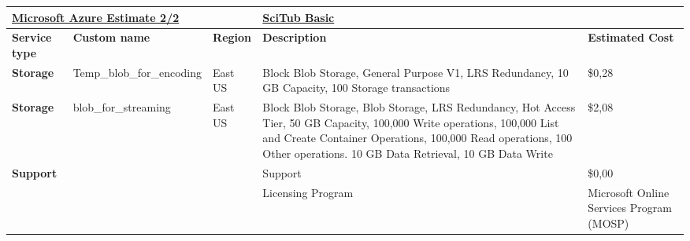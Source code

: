 \begin{landscape}
\begin{table}[]
    \begin{tabularx}{\linewidth}{|l|X|X|X|X|}        %
    \hline
    \multicolumn{3}{|l|}{{\ul \textbf{Microsoft Azure Estimate 2/2}}}                     & {\ul \textbf{SciTub Basic}}                                                                                                                                                                                                                      & {\ul \textbf{}}                          \\ \hline
    \textbf{Service type}             & \textbf{Custom name}      & \textbf{Region} & \textbf{Description}                                                                                                                                                                                                                             & \textbf{Estimated Cost}                  \\ \hline\hline
    \textbf{Storage}                  & Temp\_blob\_for\_encoding & East US         & Block Blob Storage, General Purpose V1, LRS Redundancy, 10 GB Capacity, 100 Storage transactions                                                                                                                                                 & \$0,28                                   \\ \hline
\textbf{Storage}                  & blob\_for\_streaming      & East US         & Block Blob Storage, Blob Storage, LRS Redundancy, Hot Access Tier, 50 GB Capacity, 100,000 Write operations, 100,000 List and Create Container Operations, 100,000 Read operations, 100 Other operations. 10 GB Data Retrieval, 10 GB Data Write & \$2,08                                   \\ \hline
\textbf{Support}                  &                           &                 & Support                                                                                                                                                                                                                                          & \$0,00                                   \\ \hline
                                        &                           &                 & Licensing Program                                                                                                                                                                                                                                & Microsoft Online Services Program (MOSP) \\ \hline

\end{tabularx}
\end{table}
\end{landscape}
